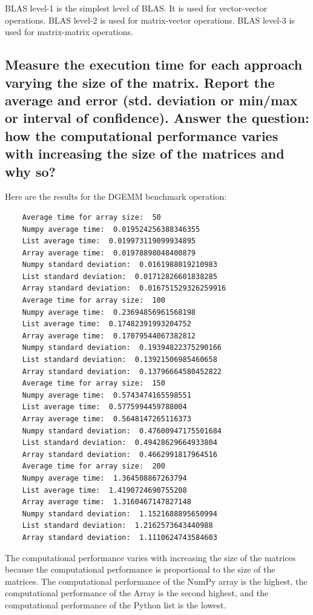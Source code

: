 \documentclass{article}
\begin{document}
BLAS level-1 is the simplest level of BLAS.
It is used for vector-vector operations.
BLAS level-2 is used for matrix-vector operations.
BLAS level-3 is used for matrix-matrix operations.



\subsection{Measure the execution time for each approach varying the size of the matrix. Report the average and error (std. deviation or min/max or interval of confidence). Answer the question: how the computational performance varies with increasing the size of the matrices and why so?}

Here are the results for the DGEMM benchmark operation:
\begin{lstlisting}
    Average time for array size:  50
    Numpy average time:  0.019524256388346355
    List average time:  0.019973119099934895
    Array average time:  0.01978898048400879
    Numpy standard deviation:  0.0161988019210983
    List standard deviation:  0.01712826601838285
    Array standard deviation:  0.016751529326259916
    Average time for array size:  100
    Numpy average time:  0.23694856961568198
    List average time:  0.17482391993204752
    Array average time:  0.17079544067382812
    Numpy standard deviation:  0.19394822375290166
    List standard deviation:  0.13921506985460658
    Array standard deviation:  0.13796664580452822
    Average time for array size:  150
    Numpy average time:  0.5743474165598551
    List average time:  0.5775994459788004
    Array average time:  0.5648147265116373
    Numpy standard deviation:  0.47600947175501684
    List standard deviation:  0.49428629664933804
    Array standard deviation:  0.4662991817964516
    Average time for array size:  200
    Numpy average time:  1.364508867263794
    List average time:  1.4190724690755208
    Array average time:  1.3160467147827148
    Numpy standard deviation:  1.1521688895650994
    List standard deviation:  1.2162573643440988
    Array standard deviation:  1.1110624743584603
\end{lstlisting}

The computational performance varies with increasing the size of the matrices because the computational performance is proportional to the size of the matrices.
The computational performance of the NumPy array is the highest, the computational performance of the Array is the second highest, and the computational performance of the Python list is the lowest.
\end{document}
